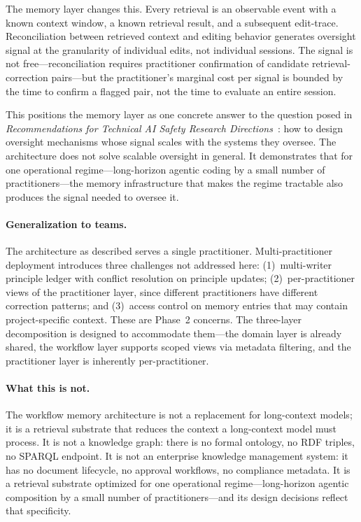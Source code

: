 \documentclass[11pt]{article}
\begin{document}
The memory layer changes this.
Every retrieval is an observable event with a known context window, a known retrieval result, and a subsequent edit-trace.
Reconciliation between retrieved context and editing behavior generates oversight signal at the granularity of individual edits, not individual sessions.
The signal is not free---reconciliation requires practitioner confirmation of candidate retrieval-correction pairs---but the practitioner's marginal cost per signal is bounded by the time to confirm a flagged pair, not the time to evaluate an entire session.

This positions the memory layer as one concrete answer to the question posed in \emph{Recommendations for Technical AI Safety Research Directions}~\citep{anthropic2025recommended}: how to design oversight mechanisms whose signal scales with the systems they oversee.
The architecture does not solve scalable oversight in general.
It demonstrates that for one operational regime---long-horizon agentic coding by a small number of practitioners---the memory infrastructure that makes the regime tractable also produces the signal needed to oversee it.

\paragraph{Generalization to teams.}
The architecture as described serves a single practitioner.
Multi-practitioner deployment introduces three challenges not addressed here: (1)~multi-writer principle ledger with conflict resolution on principle updates; (2)~per-practitioner views of the practitioner layer, since different practitioners have different correction patterns; and (3)~access control on memory entries that may contain project-specific context.
These are Phase~2 concerns.
The three-layer decomposition is designed to accommodate them---the domain layer is already shared, the workflow layer supports scoped views via metadata filtering, and the practitioner layer is inherently per-practitioner.

\paragraph{What this is not.}
The workflow memory architecture is not a replacement for long-context models; it is a retrieval substrate that reduces the context a long-context model must process.
It is not a knowledge graph: there is no formal ontology, no RDF triples, no SPARQL endpoint.
It is not an enterprise knowledge management system: it has no document lifecycle, no approval workflows, no compliance metadata.
It is a retrieval substrate optimized for one operational regime---long-horizon agentic composition by a small number of practitioners---and its design decisions reflect that specificity.
\end{document}
